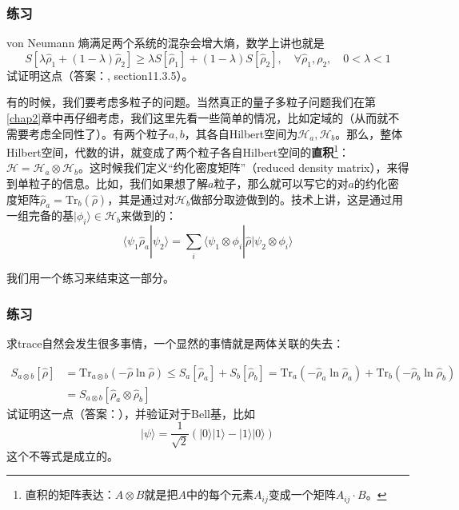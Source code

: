 \subsubsection{练习}

von Neumann 熵满足两个系统的混杂会增大熵，数学上讲也就是
\begin{equation}
S[\lambda\hat\rho_1+(1-\lambda)\hat\rho_2]\ge\lambda S[\hat\rho_1]+(1-\lambda) S[\hat\rho_2],\quad \forall \hat\rho_1,\rho_2,\quad 0<\lambda<1
\end{equation}
试证明这点（答案：\cite{nielsen2010quantum}, section11.3.5）。


有的时候，我们要考虑多粒子的问题。当然真正的量子多粒子问题我们在第\ref{chap2}章中再仔细考虑，我们这里先看一些简单的情况，比如定域的（从而就不需要考虑全同性了）。有两个粒子$a, b$，其各自Hilbert空间为$\mathcal{H}_a, \mathcal{H}_b$。那么，整体Hilbert空间，代数的讲，就变成了两个粒子各自Hilbert空间的{\bf 直积}\footnote{直积的矩阵表达：$A\otimes B$就是把$A$中的每个元素$A_{ij}$变成一个矩阵$A_{ij}\cdot B$。}：$\mathcal{H} = \mathcal{H}_a\otimes \mathcal{H}_b$。这时候我们定义``约化密度矩阵''（reduced density matrix），来得到单粒子的信息。比如，我们如果想了解$a$粒子，那么就可以写它的对$a$的约化密度矩阵$\hat\rho_a=\text{Tr}_b(\hat\rho)$，其是通过对$\mathcal{H}_b$做部分取迹做到的。技术上讲，这是通过用一组完备的基$|\phi_i\rangle \in\mathcal{H}_b$来做到的：
\begin{equation}
\langle\psi_1\hat\rho_a|\psi_2\rangle=\sum_i\langle\psi_1\otimes\phi_i|\hat\rho|\psi_2\otimes\phi_i\rangle
\end{equation}

我们用一个练习来结束这一部分。
\subsubsection{练习}
求trace自然会发生很多事情，一个显然的事情就是两体关联的失去：

\begin{equation}
\begin{split}
S_{a\otimes b}[\hat\rho]&=\text{Tr}_{a\otimes b}(-\hat\rho\ln\hat\rho)\le S_a[\hat\rho_a]+S_b[\hat\rho_b]=\text{Tr}_a(-\hat\rho_a\ln\hat\rho_a)+\text{Tr}_b(-\hat\rho_b\ln\hat\rho_b)\\
&=S_{a\otimes b}[\hat\rho_a\otimes\hat\rho_b]
\end{split}
\end{equation}
试证明这一点（答案：\cite{trace}），并验证对于Bell基，比如
\begin{equation}
|\psi\rangle = \frac{1}{\sqrt{2}}(|0\rangle|1\rangle-|1\rangle|0\rangle)
\end{equation}
这个不等式是成立的。

